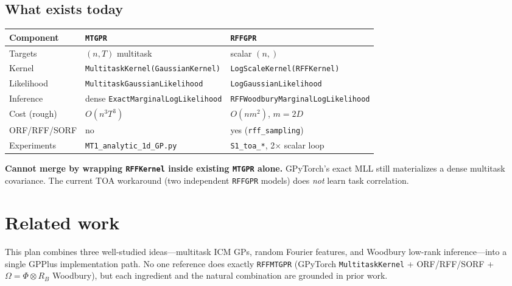 \documentclass[11pt]{article}
\theoremstyle{plain}
\newcommand{\Ph}{\Phi}
\newcommand{\Om}{\Omega}
\newcommand{\RB}{R_B}
\begin{document}
\subsection{What exists today}

\begin{center}
\renewcommand{\arraystretch}{1.3}
\begin{tabular}{@{}p{}p{}p{}@{}}
\toprule
\textbf{Component} & \textbf{\texttt{MTGPR}} & \textbf{\texttt{RFFGPR}} \\
\midrule
Targets & $(n, T)$ multitask & scalar $(n,)$ \\
Kernel & \texttt{MultitaskKernel(GaussianKernel)} & \texttt{LogScaleKernel(RFFKernel)} \\
Likelihood & \texttt{MultitaskGaussianLikelihood} & \texttt{LogGaussianLikelihood} \\
Inference & dense \texttt{ExactMarginalLogLikelihood} & \texttt{RFFWoodburyMarginalLogLikelihood} \\
Cost (rough) & $O(n^3 T^3)$ & $O(n m^2)$, $m = 2D$ \\
ORF/RFF/SORF & no & yes (\texttt{rff\_sampling}) \\
Experiments & \texttt{MT1\_analytic\_1d\_GP.py} & \texttt{S1\_toa\_*}, 2$\times$ scalar loop \\
\bottomrule
\end{tabular}
\end{center}

\begin{diffbox}
\textbf{Cannot merge by wrapping \texttt{RFFKernel} inside existing \texttt{MTGPR} alone.}
GPyTorch's exact MLL still materializes a dense multitask covariance.
The current TOA workaround (two independent \texttt{RFFGPR} models) does \emph{not} learn task correlation.
\end{diffbox}

\section{Related work}
\label{sec:related}

This plan combines three well-studied ideas---multitask ICM GPs, random Fourier features, and
Woodbury low-rank inference---into a single GPPlus implementation path.
No one reference does exactly \texttt{RFFMTGPR} (GPyTorch \texttt{MultitaskKernel} + ORF/RFF/SORF +
$\Om = \Ph \otimes \RB$ Woodbury), but each ingredient and the natural combination are grounded
in prior work.
\end{document}
